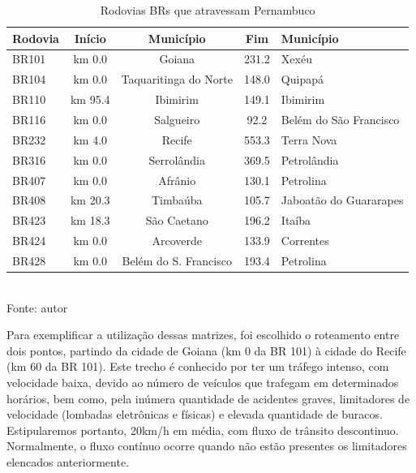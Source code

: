 \begin{table}[!ht]
	\centering
	\caption{Rodovias BRs que atravessam Pernambuco}
	\vspace{1mm}
	\begin{tabular}{l|c|c|c|l}
		\hline
		\textbf{Rodovia} & \textbf{Início} & \textbf{Município}  & \textbf{Fim} & \textbf{Município} \\
		\hline
		BR101 & km 0.0 & Goiana & 231.2 & Xexéu\\
		BR104 & km 0.0 & Taquaritinga do Norte & 148.0 & Quipapá\\
		BR110 & km 95.4 & Ibimirim & 149.1 & Ibimirim\\
		BR116 & km 0.0 & Salgueiro & 92.2 & Belém do São Francisco\\
		BR232 & km 4.0 & Recife & 553.3 & Terra Nova\\
		BR316 & km 0.0 & Serrolândia & 369.5 & Petrolândia\\
		BR407 & km 0.0 & Afrânio & 130.1 & Petrolina\\
		BR408 & km 20.3 & Timbaúba & 105.7 & Jaboatão do Guararapes\\
		BR423 & km 18.3 & São Caetano & 196.2 & Itaíba\\
		BR424 & km 0.0 & Arcoverde & 133.9 & Correntes\\
		BR428 & km 0.0 & Belém do S. Francisco & 193.4 & Petrolina\\
	\end{tabular}
	\\
	\tiny Fonte: autor
\end{table}

\vspace{7mm}

Para exemplificar a utilização dessas matrizes, foi escolhido o roteamento entre dois pontos, partindo da cidade de Goiana (km 0 da BR 101) à cidade do Recife (km 60 da BR 101). Este trecho é conhecido por ter um tráfego intenso, com velocidade  baixa, devido ao número de veículos que trafegam em determinados horários, bem como, pela inúmera quantidade de acidentes graves, limitadores de velocidade (lombadas eletrônicas e físicas) e elevada quantidade de buracos. Estipularemos portanto, 20km/h em média, com fluxo de trânsito descontinuo. Normalmente, o fluxo contínuo ocorre quando não estão presentes os limitadores elencados anteriormente.


